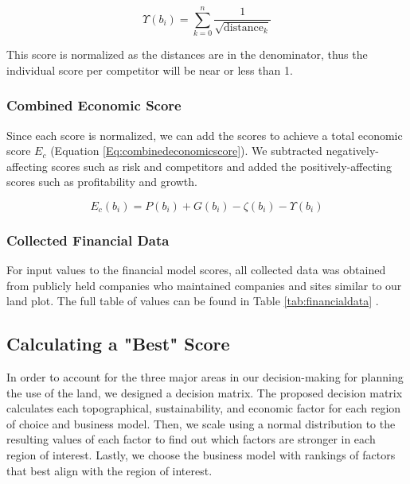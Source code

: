 \documentclass{mcmthesis}
\begin{document}
\begin{equation}
    \Upsilon(b_i) = \sum_{k=0}^n \frac{1}{\sqrt{\text{distance}_{k}}}
    \label{Eq:competitorscore}
\end{equation}

This score is normalized as the distances are in the denominator, thus the individual score per competitor will be near or less than 1. 

\subsubsection{Combined Economic Score}
Since each score is normalized, we can add the scores to achieve a total economic score $E_c$ (Equation \ref{Eq:combinedeconomicscore}). We subtracted negatively-affecting scores such as risk and competitors and added the positively-affecting scores such as profitability and growth.

\begin{equation}
    E_c(b_i) = P(b_i) + G(b_i) - \zeta(b_i) - \Upsilon(b_i)
    \label{Eq:combinedeconomicscore}
\end{equation}

\subsubsection{Collected Financial Data}
For input values to the financial model scores, all collected data was obtained from publicly held companies who maintained companies and sites similar to our land plot. The full table of values can be found in Table \ref{tab:financialdata} \cite{noauthor_vail_nodate, noauthor_adecoagro_nodate, noauthor_jbs_nodate, noauthor_grupo_nodate, noauthor_first_nodate, noauthor_cubicfarm_nodate, noauthor_carnival_nodate, noauthor_american_nodate, noauthor_farmland_nodate, noauthor_hormel_nodate, noauthor_maxeon_nodate, noauthor_hydrofarm_nodate, noauthor_general_nodate, noauthor_academy_nodate}.

\subsection{Calculating a "Best" Score}
In order to account for the three major areas in our decision-making for planning the use of the land, we designed a decision matrix. The proposed decision matrix calculates each topographical, sustainability, and economic factor for each region of choice and business model. Then, we scale using a normal distribution to the resulting values of each factor to find out which factors are stronger in each region of interest. Lastly, we choose the business model with rankings of factors that best align with the region of interest. 
\end{document}
